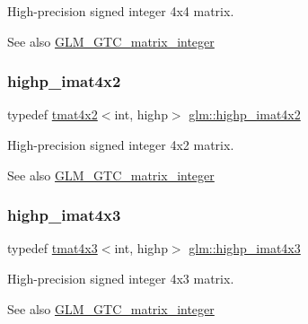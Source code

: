 High-\/precision signed integer 4x4 matrix. \begin{DoxySeeAlso}{See also}
\hyperlink{group__gtc__matrix__integer}{G\+L\+M\+\_\+\+G\+T\+C\+\_\+matrix\+\_\+integer} 
\end{DoxySeeAlso}
\mbox{\label{group__gtc__matrix__integer_ga7b936ac315e12b546d2597a4bffee4a1}} 
\subsubsection{\texorpdfstring{highp\+\_\+imat4x2}{highp\_imat4x2}}
{\footnotesize\ttfamily typedef \hyperlink{structglm_1_1tmat4x2}{tmat4x2}$<$int, highp$>$ \hyperlink{group__gtc__matrix__integer_ga7b936ac315e12b546d2597a4bffee4a1}{glm\+::highp\+\_\+imat4x2}}

High-\/precision signed integer 4x2 matrix. \begin{DoxySeeAlso}{See also}
\hyperlink{group__gtc__matrix__integer}{G\+L\+M\+\_\+\+G\+T\+C\+\_\+matrix\+\_\+integer} 
\end{DoxySeeAlso}
\mbox{\label{group__gtc__matrix__integer_ga28e21d3fe05d8476402e27081150cade}} 
\subsubsection{\texorpdfstring{highp\+\_\+imat4x3}{highp\_imat4x3}}
{\footnotesize\ttfamily typedef \hyperlink{structglm_1_1tmat4x3}{tmat4x3}$<$int, highp$>$ \hyperlink{group__gtc__matrix__integer_ga28e21d3fe05d8476402e27081150cade}{glm\+::highp\+\_\+imat4x3}}

High-\/precision signed integer 4x3 matrix. \begin{DoxySeeAlso}{See also}
\hyperlink{group__gtc__matrix__integer}{G\+L\+M\+\_\+\+G\+T\+C\+\_\+matrix\+\_\+integer} 
\end{DoxySeeAlso}
\mbox{\label{group__gtc__matrix__integer_ga2a80b8ab686297145ecf713699233114}} 
